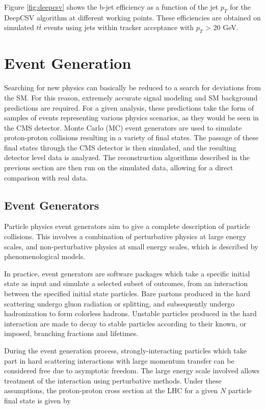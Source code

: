 Figure \ref{fig:deepcsv} shows the b-jet efficiency as a function of the jet $p_{T}$ for the DeepCSV algorithm at different working points. These efficiencies are obtained on simulated $t\bar{t}$ events using jets within tracker acceptance with $p_{T}$ > 20 GeV.



\section{Event Generation}
Searching for new physics can basically be reduced to a search for deviations from the SM. For this reason, extremely accurate signal modeling and SM background predictions are required. For a given analysis, these predictions take the form of samples of events representing various physics scenarios, as they would be seen in the CMS detector. Monte Carlo (MC) event generators are used to simulate proton-proton collisions resulting in a variety of final states. The passage of these final states through the CMS detector is then simulated, and the resulting detector level data is analyzed. The reconstruction algorithms described in the previous section are then run on the simulated data, allowing for a direct comparison with real data.

\subsection{Event Generators}
Particle physics event generators aim to give a complete description of particle collisions. This involves a combination of perturbative physics at large energy scales, and non-perturbative physics at small energy scales, which is described by phenomenological models.

In practice, event generators are software packages which take a specific initial state as input and simulate a selected subset of outcomes, from an interaction between the specified initial state particles. Bare partons produced in the hard scattering undergo gluon radiation or splitting, and subsequently undergo hadronization to form colorless hadrons. Unstable particles produced in the hard interaction are made to decay to stable particles according to their known, or imposed, branching fractions and lifetimes.

During the event generation process, strongly-interacting particles which take part in hard scattering interactions with large momentum transfer can be considered free due to asymptotic freedom. The large energy scale involved allows treatment of the interaction using perturbative methods. Under these assumptions, the proton-proton cross section at the LHC for a given $N$ particle final state is given by

